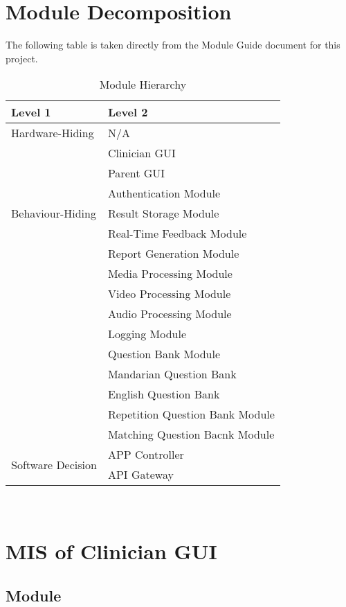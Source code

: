 \documentclass[12pt, titlepage]{article}
\begin{document}
\section{Module Decomposition}

The following table is taken directly from the Module Guide document for this project.

\begin{table}[h!]
\centering
\begin{tabular}{p{} p{}}
\toprule
\textbf{Level 1} & \textbf{Level 2}\\
\midrule

{Hardware-Hiding} & N/A \\
\midrule

\multirow{7}{0.3\textwidth}{Behaviour-Hiding} & Clinician GUI\\
& Parent GUI\\
& Authentication Module\\
& Result Storage Module\\
& Real-Time Feedback Module\\ 
& Report Generation Module\\
& Media Processing Module\\
& Video Processing Module\\
& Audio Processing Module\\
& Logging Module\\
& Question Bank Module\\
& Mandarian Question Bank\\
& English Question Bank\\
& Repetition Question Bank Module\\
& Matching Question Bacnk Module\\
\midrule

\multirow{3}{0.3\textwidth}{Software Decision} & {APP Controller}\\
& API Gateway\\
\bottomrule

\end{tabular}
\caption{Module Hierarchy}
\label{TblMH}
\end{table}

\newpage
~\newpage
\section{MIS of Clinician GUI \label{mClinicianGUI} }

\subsection{Module}
\end{document}
